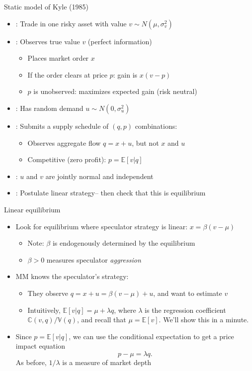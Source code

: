\documentclass[english,10pt]{beamer}
\begin{document}
\begin{frame}{Static model of Kyle (1985)}
\begin{itemize}
	\item {}: Trade in one risky asset with value  $v \sim N(\mu, \sigma^2_v)$
	\item {}: Observes true value $v$ (perfect information)
	\begin{itemize}
		\item Places market order $x$
		\item If the order clears at price $p$: gain is $x(v-p)$
		\item $p$ is \alert{unobserved}: maximizes expected gain (risk neutral)
	\end{itemize}
	\item {}: Has random demand $u \sim N(0, \sigma^2_u)$
	\item {}: Submits a supply schedule of $(q,p)$ combinations:
	\begin{itemize}
		\item Observes aggregate flow $q=x+u$, but not $x$ and $u$
		\item Competitive (zero profit): $p = \mathbb{E}[v|q]$
	\end{itemize}
	\item {}: $u$ and $v$ are jointly normal and independent
	\item {}: Postulate linear strategy-- then check that this is equilibrium
\end{itemize}
\end{frame}


\begin{frame}{Linear equilibrium}
\begin{itemize}
	\item Look for equilibrium where speculator strategy is linear: \alert{$x=\beta(v-\mu)$}
	\begin{itemize}
		\item Note: $\beta$ is endogenously determined by the equilibrium
		\item $\beta>0$ measures speculator \textit{aggression}
	\end{itemize}
	\item MM knows the speculator's strategy:
	\begin{itemize}
		\item They observe $q=x+u=\beta(v-\mu)+u$, and want to \alert{estimate $v$}
		\item Intuitively, \alert{$\mathbb{E}[v|q] = \mu + \lambda  q$}, where $\lambda $ is the regression coefficient $\mathbb{C}(v,q)/\mathbb{V}(q)$, and recall that $\mu=\mathbb{E}[v]$. We'll show this in a minute.
	\end{itemize}
	\item Since $p=\mathbb{E}[v|q]$, we can use the conditional expectation to get a price impact equation 
	\[
	p-\mu=\lambda q.
	\]
	As before, $1/\lambda$ is a measure of market depth
\end{itemize}
\end{frame}
\end{document}
